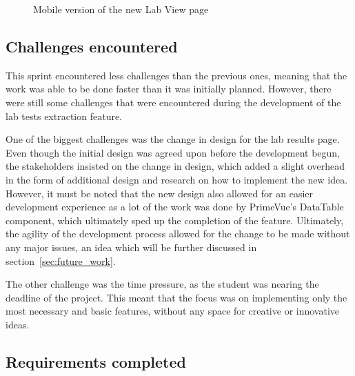 \FloatBarrier{}

\begin{figure}[ht]
  \centering
  \hfill
  \caption{Mobile version of the new Lab View page}\label{fig:labs_page_mobile}
\end{figure}

\FloatBarrier{}

\subsection{Challenges encountered}

This sprint encountered less challenges than the previous ones, meaning that the work was able to be done faster than it was initially planned. However, there were still some challenges that were encountered during the development of the lab tests extraction feature.

One of the biggest challenges was the change in design for the lab results page. Even though the initial design was agreed upon before the development begun, the stakeholders insisted on the change in design, which added a slight overhead in the form of additional design and research on how to implement the new idea. However, it must be noted that the new design also allowed for an easier development experience as a lot of the work was done by PrimeVue's DataTable component, which ultimately sped up the completion of the feature. Ultimately, the agility of the development process allowed for the change to be made without any major issues, an idea which will be further discussed in section~\ref{sec:future_work}.

The other challenge was the time pressure, as the student was nearing the deadline of the project. This meant that the focus was on implementing only the most necessary and basic features, without any space for creative or innovative ideas.

\subsection{Requirements completed}

